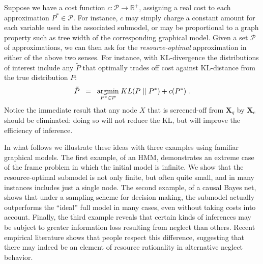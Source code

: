 \documentclass[10pt,letterpaper]{article}
\newcommand{\red}[1]{\textcolor{Red}{#1}}
\begin{document}
Suppose we have a cost function $c: \mathcal{P}\rightarrow\mathbb{R}^+$, assigning a real cost to each approximation $P^* \in \mathcal{P}$. For instance, $c$ may simply charge a constant amount for each variable used in the associated submodel, or may be proportional to a graph property such as tree width of the corresponding graphical model. Given a set $\mathcal{P}$ of approximations, we can then ask for the \emph{resource-optimal} approximation  in either of the above two senses. For instance, with KL-divergence the distributions of interest include any $\tilde{P}$ that optimally trades off cost against KL-distance from the true distribution $P$: 
%
\begin{equation} \tilde{P} \;\;= \;\; \underset{P^*\in\mathcal{P}}{\textnormal{argmin}} \; KL(P\;||\;P^*) + c(P^*)\;.\label{optimal}\end{equation}
%
Notice the immediate result that any node $X$ that is screened-off from $\textbf{X}_q$ by $\textbf{X}_e$ should be eliminated: doing so will not reduce the KL, but will improve the efficiency of inference.

In what follows we illustrate these ideas with three examples using familiar graphical models. The first example, of an HMM, demonstrates an extreme case of the frame problem in which the initial model is infinite. We show that the resource-optimal submodel is not only finite, but often quite small, and in many instances includes just a single node. The second example, of a causal Bayes net, shows that under a sampling scheme for decision making, the submodel actually outperforms the ``ideal'' full model in many cases, even without taking costs into account. Finally, the third example  reveals that certain kinds of inferences may be subject to greater information loss resulting from neglect than others. Recent empirical literature shows that people respect this difference, suggesting that there may indeed be an element of resource rationality in alternative neglect behavior.

\end{document}
